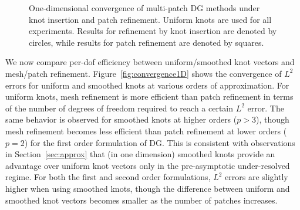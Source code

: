 \documentclass[preprint,10pt]{elsarticle}
\newcommand{\logLogSlopeTriangle}[5]
{

    \pgfplotsextra
    {
        \pgfkeysgetvalue{/pgfplots/xmin}{\xmin}
        \pgfkeysgetvalue{/pgfplots/xmax}{\xmax}
        \pgfkeysgetvalue{/pgfplots/ymin}{\ymin}
        \pgfkeysgetvalue{/pgfplots/ymax}{\ymax}

        \pgfmathsetmacro{\xArel}{#1}
        \pgfmathsetmacro{\yArel}{#3}
        \pgfmathsetmacro{\xBrel}{#1-#2}
        \pgfmathsetmacro{\yBrel}{\yArel}
        \pgfmathsetmacro{\xCrel}{\xArel}

        \pgfmathsetmacro{\lnxB}{\xmin*(1-(#1-#2))+\xmax*(#1-#2)} %
        \pgfmathsetmacro{\lnxA}{\xmin*(1-#1)+\xmax*#1} %
        \pgfmathsetmacro{\lnyA}{\ymin*(1-#3)+\ymax*#3} %
        \pgfmathsetmacro{\lnyC}{\lnyA+#4*(\lnxA-\lnxB)}
        \pgfmathsetmacro{\yCrel}{\lnyC-\ymin)/(\ymax-\ymin)} %

        \coordinate (A) at (rel axis cs:\xArel,\yArel);
        \coordinate (B) at (rel axis cs:\xBrel,\yBrel);
        \coordinate (C) at (rel axis cs:\xCrel,\yCrel);

        \draw[#5]   (A)-- node[pos=0.5,anchor=north] {1}
                    (B)-- 
                    (C)-- node[pos=0.5,anchor=west] {#4}
                    cycle;
    }
}
\newcommand{\logLogSlopeTriangleFlip}[5]
{

    \pgfplotsextra
    {
        \pgfkeysgetvalue{/pgfplots/xmin}{\xmin}
        \pgfkeysgetvalue{/pgfplots/xmax}{\xmax}
        \pgfkeysgetvalue{/pgfplots/ymin}{\ymin}
        \pgfkeysgetvalue{/pgfplots/ymax}{\ymax}

        \pgfmathsetmacro{\xBrel}{#1-#2}
        \pgfmathsetmacro{\yBrel}{#3}
        \pgfmathsetmacro{\xCrel}{#1}

        \pgfmathsetmacro{\lnxB}{\xmin*(1-(#1-#2))+\xmax*(#1-#2)} %
        \pgfmathsetmacro{\lnxA}{\xmin*(1-#1)+\xmax*#1} %
        \pgfmathsetmacro{\lnyA}{\ymin*(1-#3)+\ymax*#3} %
        \pgfmathsetmacro{\lnyC}{\lnyA+#4*(\lnxA-\lnxB)}
        \pgfmathsetmacro{\yCrel}{\lnyC-\ymin)/(\ymax-\ymin)} %

	\pgfmathsetmacro{\xArel}{\xBrel}
        \pgfmathsetmacro{\yArel}{\yCrel}

        \coordinate (A) at (rel axis cs:\xArel,\yArel);
        \coordinate (B) at (rel axis cs:\xBrel,\yBrel);
        \coordinate (C) at (rel axis cs:\xCrel,\yCrel);

        \draw[#5]   (A)-- node[pos=0.5,anchor=east] {#4}
                    (B)-- 
                    (C)-- node[pos=0.5,anchor=south] {1}
                    cycle;
    }
}
\begin{document}
\begin{figure}
{
}
\caption{One-dimensional convergence of multi-patch DG methods under knot insertion and patch refinement.  Uniform knots are used for all experiments.  Results for refinement by knot insertion are denoted by circles, while results for patch refinement are denoted by squares.}
\label{fig:hconvergence1D}
\end{figure}

We now compare per-dof efficiency between uniform/smoothed knot vectors and mesh/patch refinement.  Figure~\ref{fig:convergence1D} shows the convergence of $L^2$ errors for uniform and smoothed knots at various orders of approximation.  For uniform knots, mesh refinement is more efficient than patch refinement in terms of the number of degrees of freedom required to reach a certain $L^2$ error.  The same behavior is observed for smoothed knots at higher orders ($p>3$), though mesh refinement becomes less efficient than patch refinement at lower orders ($p=2$) for the first order formulation of DG.  This is consistent with observations in Section~\ref{sec:approx} that  (in one dimension) smoothed knots provide an advantage over uniform knot vectors only in the pre-asymptotic under-resolved regime.  For both the first and second order formulations, $L^2$ errors are slightly higher when using smoothed knots, though the difference between uniform and smoothed knot vectors becomes smaller as the number of patches increases.  
\end{document}
